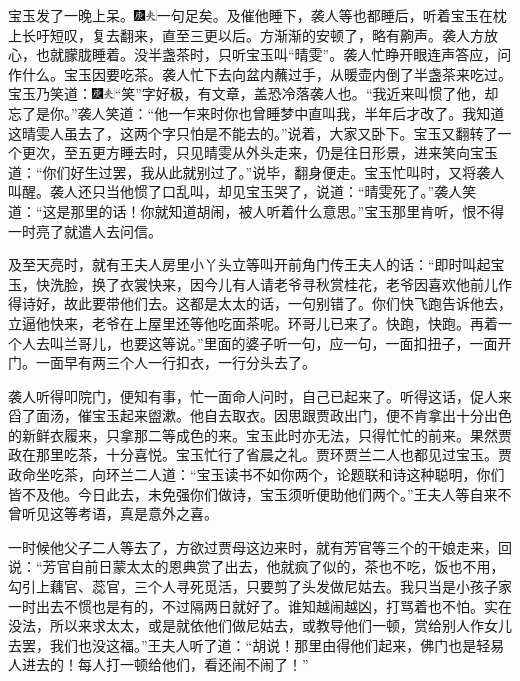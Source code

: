 宝玉发了一晚上呆。{\includegraphics[width=3mm]{../Images/00004}\includegraphics[width=3mm]{../Images/00012}\footnotesize \kaishu 一句足矣。}及催他睡下，袭人等也都睡后，听着宝玉在枕上长吁短叹，复去翻来，直至三更以后。方渐渐的安顿了，略有齁声。袭人方放心，也就朦胧睡着。没半盏茶时，只听宝玉叫``晴雯''。袭人忙睁开眼连声答应，问作什么。宝玉因要吃茶。袭人忙下去向盆内蘸过手，从暖壶内倒了半盏茶来吃过。宝玉乃笑道：{\includegraphics[width=3mm]{../Images/00004}\includegraphics[width=3mm]{../Images/00012}\footnotesize \kaishu ``笑''字好极，有文章，盖恐冷落袭人也。}``我近来叫惯了他，却忘了是你。''袭人笑道：``他一乍来时你也曾睡梦中直叫我，半年后才改了。我知道这晴雯人虽去了，这两个字只怕是不能去的。''说着，大家又卧下。宝玉又翻转了一个更次，至五更方睡去时，只见晴雯从外头走来，仍是往日形景，进来笑向宝玉道：``你们好生过罢，我从此就别过了。''说毕，翻身便走。宝玉忙叫时，又将袭人叫醒。袭人还只当他惯了口乱叫，却见宝玉哭了，说道：``晴雯死了。''袭人笑道：``这是那里的话！你就知道胡闹，被人听着什么意思。''宝玉那里肯听，恨不得一时亮了就遣人去问信。

及至天亮时，就有王夫人房里小丫头立等叫开前角门传王夫人的话：``即时叫起宝玉，快洗脸，换了衣裳快来，因今儿有人请老爷寻秋赏桂花，老爷因喜欢他前儿作得诗好，故此要带他们去。这都是太太的话，一句别错了。你们快飞跑告诉他去，立逼他快来，老爷在上屋里还等他吃面茶呢。环哥儿已来了。快跑，快跑。再着一个人去叫兰哥儿，也要这等说。''里面的婆子听一句，应一句，一面扣扭子，一面开门。一面早有两三个人一行扣衣，一行分头去了。

袭人听得叩院门，便知有事，忙一面命人问时，自己已起来了。听得这话，促人来舀了面汤，催宝玉起来盥漱。他自去取衣。因思跟贾政出门，便不肯拿出十分出色的新鲜衣履来，只拿那二等成色的来。宝玉此时亦无法，只得忙忙的前来。果然贾政在那里吃茶，十分喜悦。宝玉忙行了省晨之礼。贾环贾兰二人也都见过宝玉。贾政命坐吃茶，向环兰二人道：``宝玉读书不如你两个，论题联和诗这种聪明，你们皆不及他。今日此去，未免强你们做诗，宝玉须听便助他们两个。''王夫人等自来不曾听见这等考语，真是意外之喜。

一时候他父子二人等去了，方欲过贾母这边来时，就有芳官等三个的干娘走来，回说：``芳官自前日蒙太太的恩典赏了出去，他就疯了似的，茶也不吃，饭也不用，勾引上藕官、蕊官，三个人寻死觅活，只要剪了头发做尼姑去。我只当是小孩子家一时出去不惯也是有的，不过隔两日就好了。谁知越闹越凶，打骂着也不怕。实在没法，所以来求太太，或是就依他们做尼姑去，或教导他们一顿，赏给别人作女儿去罢，我们也没这福。''王夫人听了道：``胡说！那里由得他们起来，佛门也是轻易人进去的！每人打一顿给他们，看还闹不闹了！''

